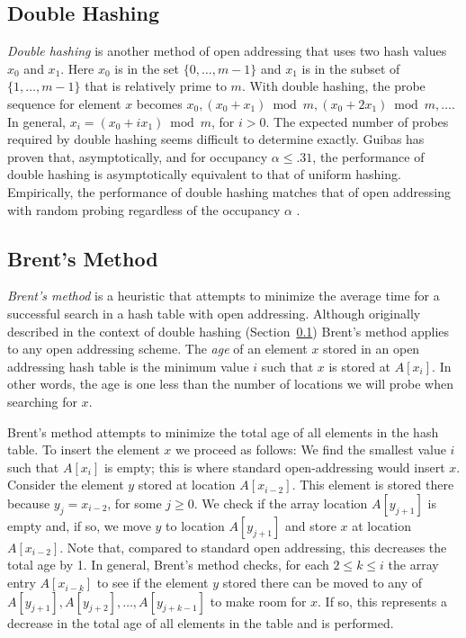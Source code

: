 \subsection{Double Hashing}\label{hash:sec:double}

\emph{Double hashing} is another method of open addressing that uses two hash
values $x_0$ and $x_1$.  Here $x_0$ is in the set $\{0,\ldots,m-1\}$
and $x_1$ is in the subset of $\{1,\ldots,m-1\}$ that is relatively
prime to $m$.  With double hashing, the probe sequence for element $x$
becomes $x_0,(x_0+x_1)\bmod m, (x_0+2x_1)\bmod m,\ldots$.  In general,
$x_i=(x_0+ix_1)\bmod m$, for $i>0$.  The expected number of probes
required by double hashing seems difficult to determine exactly.
Guibas has proven that, asymptotically, and for occupancy $\alpha\le
.31$, the performance of double hashing is asymptotically equivalent
to that of uniform hashing.  Empirically, the performance of double
hashing matches that of open addressing with random probing
regardless of the occupancy $\alpha$ \cite{k97}.

\subsection{Brent's Method}\label{hash:sec:brent}

\emph{Brent's method} \cite{b73} is a heuristic that attempts to
minimize the average time for a successful search in a hash table with
open addressing.  Although originally described in the context of
double hashing (Section~\ref{hash:sec:double}) Brent's method applies
to any open addressing scheme.  The \emph{age} of an element $x$
stored in an open addressing hash table is the minimum value $i$ such
that $x$ is stored at $A[x_i]$.  In other words, the age is one less
than the number of locations we will probe when searching for $x$. 

Brent's method attempts to minimize the total age of all elements in
the hash table.  To insert the element $x$ we proceed as follows:  We
find the smallest value $i$ such that $A[x_i]$ is empty; this is where
standard open-addressing would insert $x$.  Consider the element $y$
stored at location $A[x_{i-2}]$.  This element is stored there because
$y_j=x_{i-2}$, for some $j\ge 0$.  We check if the array location
$A[y_{j+1}]$ is empty and, if so, we move $y$ to location $A[y_{j+1}]$
and store $x$ at location $A[x_{i-2}]$.  Note that, compared to
standard open addressing, this decreases the total age by 1.  In
general, Brent's method checks, for each $2\le k\le i$ the array entry
$A[x_{i-k}]$ to see if the element $y$ stored there can be moved to
any of $A[y_{j+1}],A[y_{j+2}],\ldots,A[y_{j+k-1}]$ to make room for
$x$.  If so, this represents a decrease in the total age of all
elements in the table and is performed.

